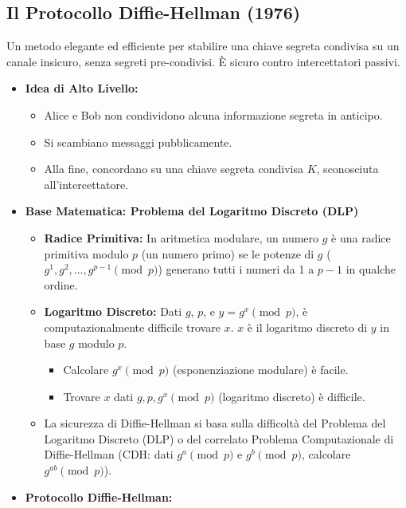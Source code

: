 \subsection{Il Protocollo Diffie-Hellman (1976)}
Un metodo elegante ed efficiente per stabilire una chiave segreta condivisa su un canale insicuro, senza segreti pre-condivisi. È sicuro contro intercettatori passivi.
\begin{itemize}
    \item \textbf{Idea di Alto Livello:}
        \begin{itemize}
            \item Alice e Bob non condividono alcuna informazione segreta in anticipo.
            \item Si scambiano messaggi pubblicamente.
            \item Alla fine, concordano su una chiave segreta condivisa $K$, sconosciuta all'intercettatore.
        \end{itemize}
    \item \textbf{Base Matematica: Problema del Logaritmo Discreto (DLP)}
        \begin{itemize}
            \item \textbf{Radice Primitiva:} In aritmetica modulare, un numero $g$ è una radice primitiva modulo $p$ (un numero primo) se le potenze di $g$ ($g^1, g^2, \dots, g^{p-1} \pmod{p}$) generano tutti i numeri da 1 a $p-1$ in qualche ordine.
            \item \textbf{Logaritmo Discreto:} Dati $g$, $p$, e $y = g^x \pmod{p}$, è computazionalmente difficile trovare $x$. $x$ è il logaritmo discreto di $y$ in base $g$ modulo $p$.
                \begin{itemize}
                    \item Calcolare $g^x \pmod{p}$ (esponenziazione modulare) è facile.
                    \item Trovare $x$ dati $g, p, g^x \pmod{p}$ (logaritmo discreto) è difficile.
                \end{itemize}
            \item La sicurezza di Diffie-Hellman si basa sulla difficoltà del Problema del Logaritmo Discreto (DLP) o del correlato Problema Computazionale di Diffie-Hellman (CDH: dati $g^a \pmod p$ e $g^b \pmod p$, calcolare $g^{ab} \pmod p$).
        \end{itemize}
    \item \textbf{Protocollo Diffie-Hellman:}
        \begin{enumerate}

\end{enumerate}
\end{itemize}
